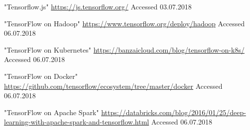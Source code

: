 \documentclass[journal]{IEEEtran}
\begin{document}
\begin{thebibliography}{1}
"Tensorflow.js"
\url{https://js.tensorflow.org/}
Accessed 03.07.2018

"TensorFlow on Hadoop"
\url{https://www.tensorflow.org/deploy/hadoop}
Accessed 06.07.2018

"TensorFlow on Kubernetes"
\url{https://banzaicloud.com/blog/tensorflow-on-k8s/}
Accessed 06.07.2018

"TensorFlow on Docker"
\url{https://github.com/tensorflow/ecosystem/tree/master/docker}
Accessed 06.07.2018

"TensorFlow on Apache Spark"
\url{https://databricks.com/blog/2016/01/25/deep-learning-with-apache-spark-and-tensorflow.html}
Accessed 06.07.2018

\end{thebibliography}

% 






\end{document}
